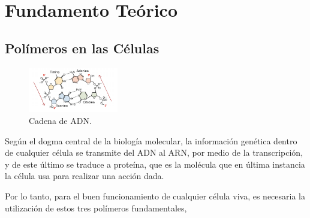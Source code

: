 \documentclass[a4paper,11pt,titlepage]{article}
\theoremstyle{definition}
\begin{document}

\section{Fundamento Teórico}\label{sec:thry}

\subsection{Polímeros en las Células}\label{subsec:polymers}

\begin{figure}
    \begin{center}
      \includegraphics[width=0.35\textwidth]{adn.png}
    \end{center}
    \caption{Cadena de ADN.}
    \label{fig:adnchain}
  \end{figure}

Según el dogma central de la biología molecular, la información genética dentro de cualquier célula se transmite del ADN al ARN, por medio de la transcripción, y de este último se traduce a proteína, que es la molécula que en última instancia la célula usa para realizar una acción dada\cite{alberts}.

Por lo tanto, para el buen funcionamiento de cualquier célula viva, es necesaria la utilización de estos tres polímeros fundamentales,
\end{document}

